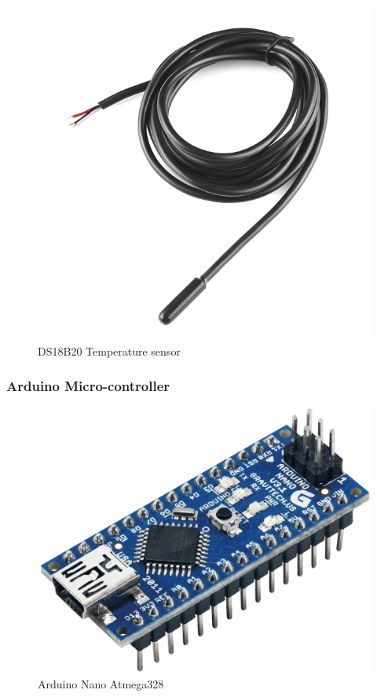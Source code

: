 \documentclass[10pt]{beamer}
\begin{document}
{{\begin{frame}
\begin{figure}[h!]
			\includegraphics[scale=1]{images/sensor}
			\caption{DS18B20 Temperature sensor}
		\end{figure}
	\end{frame}
}
{
	\begin{frame}
		\frametitle{Arduino Micro-controller}
		\begin{figure}[h!]
				\includegraphics[scale=0.1]{images/arduino_nano}
				\caption{Arduino Nano Atmega328}
		\end{figure}
	\end{frame}
}

}
\end{document}
